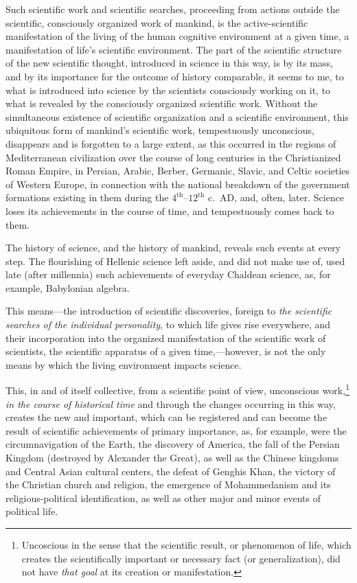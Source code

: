 Such scientific work and scientific searches, proceeding from actions outside
the scientific, consciously organized work of mankind, is the active-scientific
manifestation of the living of the human cognitive environment at a given time,
a manifestation of life's scientific environment.  The part of the scientific
structure of the new scientific thought, introduced in science in this way, is
by its mass, and by its importance for the outcome of history comparable, it
seems to me, to what is introduced into science by the scientists consciously
working on it, to what is revealed by the consciously organized scientific
work.  Without the simultaneous existence of scientific organization and a
scientific environment, this ubiquitous form of mankind's scientific work,
tempestuously unconscious, disappears and is forgotten to a large extent, as
this occurred in the regions of Mediterranean civilization over the course of
long centuries in the Christianized Roman Empire, in Persian, Arabic, Berber,
Germanic, Slavic, and Celtic societies of Western Europe, in connection with
the national breakdown of the government formations existing in them during the
$4^\mathrm{th}$--$12^\mathrm{th}$ c.\ AD, and, often, later.  Science loses its
achievements in the course of time, and tempestuously comes back to them.

The history of science, and the history of mankind, reveals such events at
every step.  The flourishing of Hellenic science left aside, and did not make
use of, used late (after millennia) such achievements of everyday Chaldean
science, as, for example, Babylonian algebra.


\Section %
This means---the introduction of scientific discoveries, foreign to \emph{the
scientific searches of the individual personality}, to which life gives rise
everywhere, and their incorporation into the organized manifestation of the
scientific work of scientists, the scientific apparatus of a given
time,---however, is not the only means by which the living environment impacts
science.

This, in and of itself collective,  from a scientific point
of view, unconscious work,\footnote{%
	Uncoscious in the sense that the scientific result, or phenomenon of
	life, which creates the scientifically important or necessary fact (or
	generalization), did not have \emph{that goal} at its creation or
	manifestation.
} \emph{in the course of historical time} and through the
changes occurring in this way, creates the new and important, which can be
registered and can become the result of scientific achievements of primary
importance, as, for example, were the circumnavigation of the Earth, the
discovery of America, the fall of the Persian Kingdom (destroyed by Alexander
the Great), as well as the Chinese kingdoms and Central Asian cultural centers,
the defeat of Genghis Khan, the victory of the Christian church and religion,
the emergence of Mohammedanism and its religious-political identification, as
well as other major and minor events of political life.

